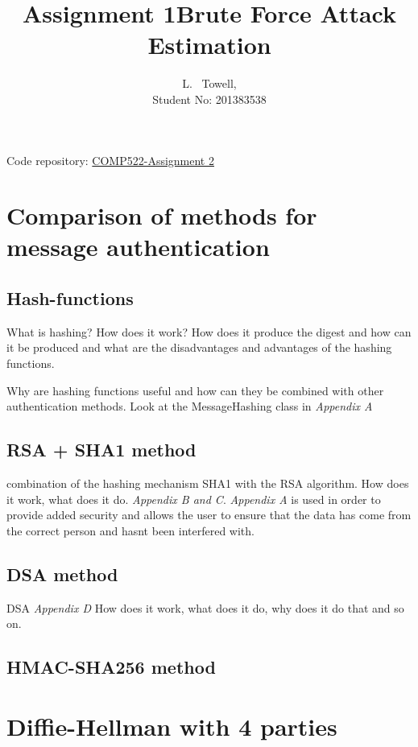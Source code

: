 \documentclass[a4paper, twoside, 11pt]{article}
\author{L. ~Towell,\\ Student No: 201383538}
\title{Assignment 1\break Brute Force Attack Estimation}
\begin{document}
	\maketitle

\maketitle
\begin{center}
Code repository: \href{https://github.com/luketowell/COMP522-Assignment2}{COMP522-Assignment 2}
\end{center}

\section{Comparison of methods for message authentication}
\subsection{Hash-functions}
What is hashing? How does it work? How does it produce the digest and how can it be produced and what are the disadvantages and advantages of the hashing functions. 

Why are hashing functions useful and how can they be combined with other authentication methods. Look at the MessageHashing class in \textit{Appendix A}
\subsection{RSA + SHA1 method}
combination of the hashing mechanism SHA1 with the RSA algorithm. How does it work, what does it do. \textit {Appendix B and C}.
\textit { Appendix A } is used in order to provide added security and allows the user to ensure that the data has come from the correct person and hasnt been interfered with.
\subsection{DSA method}
DSA  \textit{Appendix D} How does it work, what does it do, why does it do that and so on.
\subsection{HMAC-SHA256 method}


\section{Diffie-Hellman with 4 parties}
\end{document}
